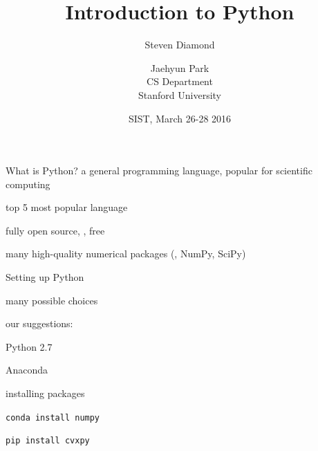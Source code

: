 \documentclass[10pt,mathserif]{beamer}
\title{\large \bfseries Introduction to Python}
\author{Steven Diamond \and Jaehyun Park \\[1ex]
CS Department\\[1ex]
Stanford University}
\date{SIST, March 26-28 2016}
\begin{document}
\frame{
\thispagestyle{empty}
\titlepage
}

\begin{frame}{What is Python?}
a general programming language, popular for scientific computing

\BIT
\item top 5 most popular language
\item fully open source, \ie, free
\item many high-quality numerical packages (\eg, NumPy, SciPy)
\EIT
\end{frame}

\begin{frame}{Setting up Python}
\BIT
\item many possible choices
\item our suggestions:
\BIT
\item Python 2.7
\item Anaconda
\EIT
\item installing packages
\BIT
\item \texttt{conda install numpy}
\item \texttt{pip install cvxpy}
\EIT
\EIT
\end{frame}
\end{document}
